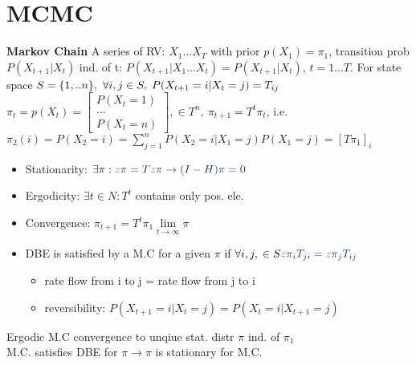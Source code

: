 \section{MCMC}
\textbf{Markov Chain}
A series of RV: $X_{1}...X_{T}$ with prior $p(X_{1})=\pi_{1}$, transition prob $P(X_{t+1} | X_{t})$ ind. of t:
$P(X_{t+1}| X_{1}...X_{t}) = P(X_{t+1}|X_{t})$, $t=1...T$.
For state space $S=\{1,..n\},\ \Forall {i,j \in S} P(X_{t+1}=i| X_{t}=j) = T_{ij}$
$\pi_{t}=p(X_{t})=\begin{bmatrix} P(X_{t}=1) \\ ... \\ P(X_{t}=n) \end{bmatrix}, \in T^{n},\ \pi_{t+1}=T^{t}\pi_{t}$,
i.e. $\pi_{2}(i) = P(X_{2}=i) = \sum_{j=1}^{n}P(X_{2}=i|X_{1}=j)P(X_{1}=j)= \left[T\pi_{1}\right]_{i}$
\begin{itemize}
	\item Stationarity: $\exists \pi: \color{gray}z \color{myblue}\pi = T \color{gray}z \color{myblue}\pi
	\rightarrow (I-H)\pi =0$
	\item Ergodicity: $\exists t \in N: T^{t}$ contains only pos. ele.
	\item Convergence: $\pi_{t+1} = T^{t}\pi_{1} \lim\limits_{t \to \infty} \pi$
	\item DBE is satisfied by a M.C for a given $\pi$ if $\Forall {i,j} \in S
	\color{gray}z \color{myblue}\pi_{i}T_{ji} = \color{gray}z \color{myblue}\pi_{j}T_{ij}$
	\begin{itemize}
		\item rate flow from i to j = rate flow from j to i
		\item reversibility: $P(X_{t+1}=i|X_{t}=j) = P(X_{t}=i|X_{t+1}=j)$
	\end{itemize}
\end{itemize}
Ergodic M.C convergence to unqiue stat. distr $\pi$ ind. of $\pi_{1}$\\
M.C. satisfies DBE for $\pi \rightarrow \pi$ is stationary for M.C.

